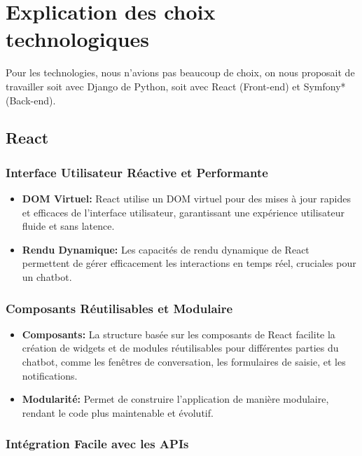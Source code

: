 \section{Explication des choix technologiques}

\hspace{16pt}Pour les technologies, nous n'avions pas beaucoup de choix, on nous proposait de travailler soit avec Django de Python, soit avec React (Front-end) et Symfony* (Back-end).

\subsection{React}


\subsubsection{Interface Utilisateur Réactive et Performante}

\begin{itemize}
  \item \textbf{DOM Virtuel: }React utilise un DOM virtuel pour des mises à jour rapides et efficaces de l'interface utilisateur, garantissant une expérience utilisateur fluide et sans latence.
  \item \textbf{Rendu Dynamique: }Les capacités de rendu dynamique de React permettent de gérer efficacement les interactions en temps réel, cruciales pour un chatbot.
\end{itemize}

\subsubsection{Composants Réutilisables et Modulaire}
 
\begin{itemize}
  \item \textbf{Composants: }La structure basée sur les composants de React facilite la création de widgets et de modules réutilisables pour différentes parties du chatbot, comme les fenêtres de conversation, les formulaires de saisie, et les notifications.
  \item \textbf{Modularité: }Permet de construire l'application de manière modulaire, rendant le code plus maintenable et évolutif.
\end{itemize}

\subsubsection{Intégration Facile avec les APIs}

